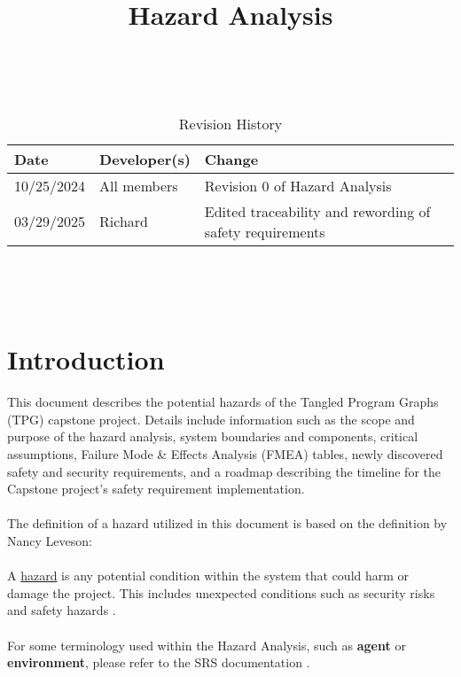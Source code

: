 \documentclass{article}
\title{Hazard Analysis\\\progname}
\author{\authname}
\date{}
\begin{document}
\maketitle
\thispagestyle{empty}

~\newpage


\begin{table}[hp]
\caption{Revision History} \label{TblRevisionHistory}
\begin{tabularx}{\textwidth}{llX}
\toprule
\textbf{Date} & \textbf{Developer(s)} & \textbf{Change}\\
\midrule
10/25/2024 & All members & Revision 0 of Hazard Analysis\\
03/29/2025 & Richard & Edited traceability and rewording of safety requirements \\
\bottomrule
\end{tabularx}
\end{table}

~\newpage

\tableofcontents

~\newpage



\section{Introduction}


This document describes the potential hazards of the Tangled Program Graphs (TPG) capstone project. Details include information such as the scope and purpose of the hazard analysis, system boundaries and components, critical assumptions, Failure Mode \& Effects Analysis (FMEA) tables, newly discovered safety and security requirements, and a roadmap describing the timeline for the Capstone project’s safety requirement implementation. 
\\\\
The definition of a hazard utilized in this document is based on the definition by Nancy Leveson:
\\\\
A \underline{hazard} is any potential condition within the system that could harm or damage the project. This includes unexpected conditions such as security risks and safety hazards \citep{Leveson2020}.
\\\\
For some terminology used within the Hazard Analysis, such as \textbf{agent} or \textbf{environment}, please refer to the SRS documentation \citep{SRS}.
\end{document}

